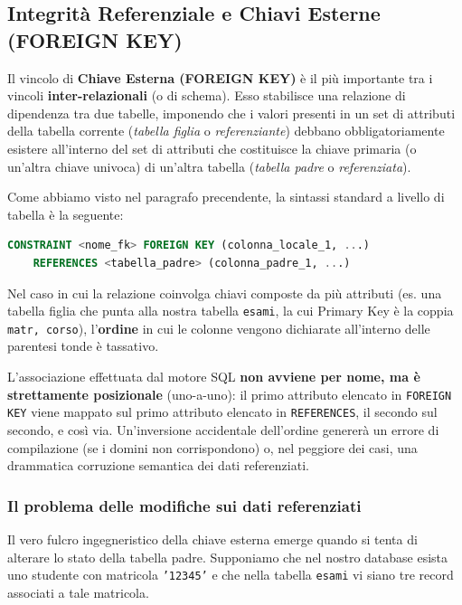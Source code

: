 \subsection{Integrità Referenziale e Chiavi Esterne (FOREIGN KEY)}

Il vincolo di \textbf{Chiave Esterna (FOREIGN KEY)} è il più importante tra i vincoli \textbf{inter-relazionali} (o di schema). Esso stabilisce una relazione di dipendenza tra due tabelle, imponendo che i valori presenti in un set di attributi della tabella corrente (\textit{tabella figlia} o \textit{referenziante}) debbano obbligatoriamente esistere all'interno del set di attributi che costituisce la chiave primaria (o un'altra chiave univoca) di un'altra tabella (\textit{tabella padre} o \textit{referenziata}).


Come abbiamo visto nel paragrafo precendente, la sintassi standard a livello di tabella è la seguente:
\begin{lstlisting}[language=SQL]
CONSTRAINT <nome_fk> FOREIGN KEY (colonna_locale_1, ...)
    REFERENCES <tabella_padre> (colonna_padre_1, ...)
\end{lstlisting}

\begin{warningbox}
Nel caso in cui la relazione coinvolga chiavi composte da più attributi (es. una tabella figlia che punta alla nostra tabella \texttt{esami}, la cui Primary Key è la coppia \texttt{matr, corso}), l'\textbf{ordine} in cui le colonne vengono dichiarate all'interno delle parentesi tonde è tassativo.

L'associazione effettuata dal motore SQL \textbf{non avviene per nome, ma è strettamente posizionale} (uno-a-uno): il primo attributo elencato in \texttt{FOREIGN KEY} viene mappato sul primo attributo elencato in \texttt{REFERENCES}, il secondo sul secondo, e così via. Un'inversione accidentale dell'ordine genererà un errore di compilazione (se i domini non corrispondono) o, nel peggiore dei casi, una drammatica corruzione semantica dei dati referenziati.
\end{warningbox}

\subsubsection{Il problema delle modifiche sui dati referenziati}
Il vero fulcro ingegneristico della chiave esterna emerge quando si tenta di alterare lo stato della tabella padre. Supponiamo che nel nostro database esista uno studente con matricola \texttt{'12345'} e che nella tabella \texttt{esami} vi siano tre record associati a tale matricola. 

